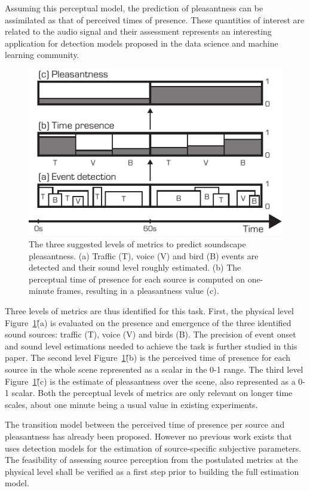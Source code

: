 \documentclass{article}
\begin{document}
\begin{sloppy}
Assuming this perceptual model, the prediction of pleasantness can be assimilated as that of perceived times of presence. These quantities of interest are related to the audio signal and their assessment represents an interesting application for detection models proposed in the data science and machine learning community.

\begin{figure}[t]
  \centering
  \centerline{\includegraphics[width=0.8\columnwidth]{block.pdf}}
  \caption{The three suggested levels of metrics to predict soundscape pleasantness. (a) Traffic (T), voice (V) and bird (B) events are detected and their sound level roughly estimated. (b) The perceptual time of presence for each source is computed on one-minute frames, resulting in a pleasantness value (c).}
  \label{fig:block}
\end{figure}

Three levels of metrics are thus identified for this task. First, the physical level Figure~\ref{fig:block}\~(a) is evaluated on the presence and emergence of the three identified sound sources: traffic (T), voice (V) and birds (B). The precision of event onset and sound level estimations needed to achieve the task is further studied in this paper. The second level Figure~\ref{fig:block}\~(b) is the perceived time of presence for each source in the whole scene represented as a scalar in the 0-1 range. The third level Figure~\ref{fig:block}\~(c) is the estimate of pleasantness over the scene, also represented as a 0-1 scalar. Both the perceptual levels of metrics are only relevant on longer time scales, about one minute being a usual value in existing experiments.

The transition model between the perceived time of presence per source and pleasantness has already been proposed. However no previous work exists that uses detection models for the estimation of source-specific subjective parameters. The feasibility of assessing source perception from the postulated metrics at the physical level shall be verified as a first step prior to building the full estimation model.


\end{sloppy}
\end{document}
